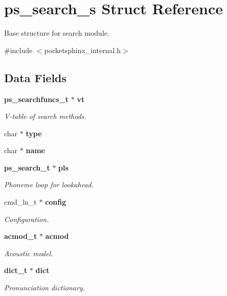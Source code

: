 \section{ps\+\_\+search\+\_\+s Struct Reference}
\label{structps__search__s}


Base structure for search module.  




{\ttfamily \#include $<$pocketsphinx\+\_\+internal.\+h$>$}

\subsection*{Data Fields}
\begin{DoxyCompactItemize}
\item 
\textbf{ ps\+\_\+searchfuncs\+\_\+t} $\ast$ \textbf{ vt}
\begin{DoxyCompactList}\small\item\em V-\/table of search methods. \end{DoxyCompactList}\item 
\mbox{\label{structps__search__s_a2f3a776232b9cc164924c415e6199eec}} 
char $\ast$ {\bfseries type}
\item 
\mbox{\label{structps__search__s_ab2f99873dc24cee2cdfe9068d41f3617}} 
char $\ast$ {\bfseries name}
\item 
\textbf{ ps\+\_\+search\+\_\+t} $\ast$ \textbf{ pls}
\begin{DoxyCompactList}\small\item\em Phoneme loop for lookahead. \end{DoxyCompactList}\item 
cmd\+\_\+ln\+\_\+t $\ast$ \textbf{ config}
\begin{DoxyCompactList}\small\item\em Configuration. \end{DoxyCompactList}\item 
\textbf{ acmod\+\_\+t} $\ast$ \textbf{ acmod}
\begin{DoxyCompactList}\small\item\em Acoustic model. \end{DoxyCompactList}\item 
\textbf{ dict\+\_\+t} $\ast$ \textbf{ dict}
\begin{DoxyCompactList}\small\item\em Pronunciation dictionary. \end{DoxyCompactList}\item 

\end{DoxyCompactItemize}
